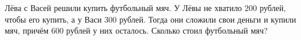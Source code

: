\begin{ex}
	\begin{condition}
		Лёва с Васей решили купить футбольный мяч. У Лёвы не хватило \( 200 \) рублей, чтобы его
		купить, а у Васи \( 300 \) рублей. Тогда они сложили свои деньги и купили мяч,
		причём \( 600 \) рублей у них осталось. Сколько стоил футбольный мяч?
	\end{condition}
\end{ex}